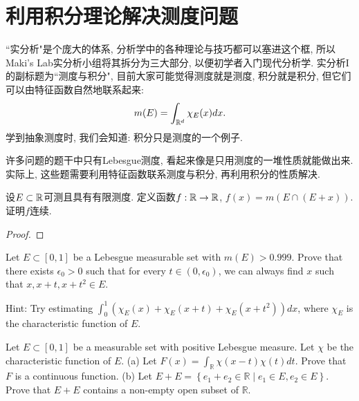 \section{利用积分理论解决测度问题}
``实分析"是个庞大的体系, 分析学中的各种理论与技巧都可以塞进这个框, 所以Maki's Lab实分析小组将其拆分为三大部分, 以便初学者入门现代分析学. 
实分析I的副标题为``测度与积分", 目前大家可能觉得测度就是测度, 积分就是积分, 但它们可以由特征函数自然地联系起来:
$$m(E) = \int_{\mathbb{R}^d} \chi_{E}(x) dx.$$
学到抽象测度时, 我们会知道: 积分只是测度的一个例子. 

许多问题的题干中只有Lebesgue测度, 看起来像是只用测度的一堆性质就能做出来. 实际上, 这些题需要利用特征函数联系测度与积分, 再利用积分的性质解决. 
\begin{example} %
    设$E \subset \mathbb{R}$可测且具有有限测度. 定义函数$f:\mathbb{R} \to \mathbb{R}$,
    $f(x)=m(E \cap(E+x))$. 证明$f$连续.
\end{example}
\begin{proof}
    
\end{proof}

\begin{example} %
    Let $E \subset[0,1]$ be a Lebesgue measurable set with $m(E)>0.999$. Prove that there exists $\epsilon_0>0$ such that for every $t \in\left(0, \epsilon_0\right)$, we can always find $x$ such that $x, x+t, x+t^2 \in E$.

    Hint: Try estimating $\int_0^1\left(\chi_E(x)+\chi_E(x+t)+\chi_E\left(x+t^2\right)\right) d x$, where $\chi_E$ is the characteristic function of $E$.
\end{example}

\begin{example} %
    Let $E \subset[0,1]$ be a measurable set with positive Lebesgue measure. Let $\chi$ be the characteristic function of $E$.
    (a) Let $F(x)=\int_{\mathbb{R}} \chi(x-t) \chi(t) d t$. Prove that $F$ is a continuous function.
    (b) Let $E+E=\left\{e_1+e_2 \in \mathbb{R} \mid e_1 \in E, e_2 \in E\right\}$. Prove that $E+E$ contains a non-empty open subset of $\mathbb{R}$.
\end{example}
